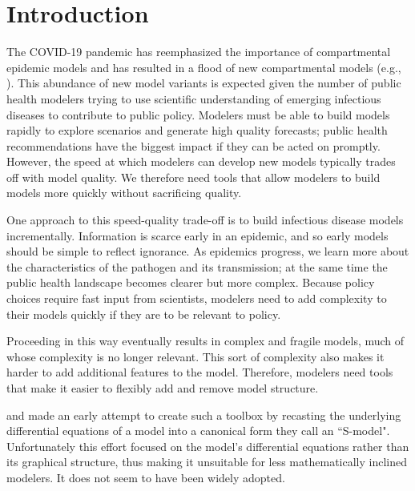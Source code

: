  

\section{Introduction}\label{intro}
The COVID-19 pandemic has reemphasized the importance of compartmental epidemic models \citep{abou2020compartmental, massonis2021structural, adam2020special, currie2020simulation, lofgren2014mathematical, mcbryde2020role, enserink2020covid} and has resulted in a flood of new compartmental models (e.g., \cite{friston2020dynamic, fields2021age, chang2022stochastic, lavielle2020extension, balabdaoui2020age, leontitsis2021seahir, LeviEarn22}). 
This abundance of new model variants is expected given the number of public health modelers trying to use scientific understanding of emerging infectious diseases to contribute to public policy. Modelers must be able to build models rapidly to explore scenarios and generate high quality forecasts; public health recommendations have the biggest impact if they can be acted on promptly. However, the speed at which modelers can develop new models typically trades off with model quality. We therefore need tools that allow modelers to build models more quickly without sacrificing quality. 

One approach to this speed-quality trade-off is to build infectious disease models incrementally. Information is scarce early in an epidemic, and so early models should be simple to reflect ignorance. As epidemics progress, we learn more about the characteristics of the pathogen and its transmission; at the same time the public health landscape becomes clearer but more complex. Because policy choices require fast input from scientists, modelers need to add complexity to their models quickly if they are to be relevant to policy. 

Proceeding in this way eventually results in complex and fragile models, much of whose complexity is no longer relevant. This sort of complexity also makes it harder to add additional features to the model. Therefore, modelers need tools that make it easier to flexibly add and remove model structure.

\cite{savageau1988introduction} and \cite{voit1988recasting, voit1990s} made an early attempt to create such a toolbox by recasting the underlying differential equations of a model into a canonical form they call an ``S-model". Unfortunately this effort focused on the model's differential equations rather than its graphical structure, thus making it unsuitable for less mathematically inclined modelers. It does not seem to have been widely adopted.

